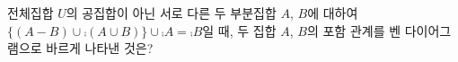 전체집합 $U$의 공집합이 아닌 서로 다른 두 부분집합 $A$, $B$에 대하여 $\{(A-B)\cup\comp{(A\cup B)}\}\cup\comp{A}=\comp{B}$일 때, 두 집합 $A$, $B$의 포함 관계를 벤 다이어그램으로 바르게 나타낸 것은?
\begin{choicesii}{}{}{}{}{}\end{choicesii}
